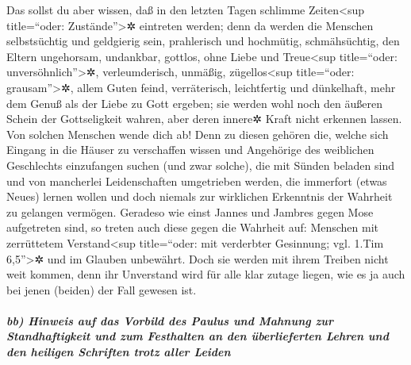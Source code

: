  Das sollst du aber wissen, daß in den letzten Tagen
schlimme Zeiten\textless sup title=``oder: Zustände''\textgreater✲
eintreten werden;  denn da werden die Menschen
selbstsüchtig und geldgierig sein, prahlerisch und hochmütig,
schmähsüchtig, den Eltern ungehorsam, undankbar, gottlos, 
ohne Liebe und Treue\textless sup title=``oder:
unversöhnlich''\textgreater✲, verleumderisch, unmäßig,
zügellos\textless sup title=``oder: grausam''\textgreater✲, allem Guten
feind,  verräterisch, leichtfertig und dünkelhaft, mehr
dem Genuß als der Liebe zu Gott ergeben;  sie werden wohl
noch den äußeren Schein der Gottseligkeit wahren, aber deren innere✲
Kraft nicht erkennen lassen. Von solchen Menschen wende dich ab!
 Denn zu diesen gehören die, welche sich Eingang in die
Häuser zu verschaffen wissen und Angehörige des weiblichen Geschlechts
einzufangen suchen (und zwar solche), die mit Sünden beladen sind und
von mancherlei Leidenschaften umgetrieben werden,  die
immerfort (etwas Neues) lernen wollen und doch niemals zur wirklichen
Erkenntnis der Wahrheit zu gelangen vermögen.  Geradeso
wie einst Jannes und Jambres gegen Mose aufgetreten sind, so treten auch
diese gegen die Wahrheit auf: Menschen mit zerrüttetem
Verstand\textless sup title=``oder: mit verderbter Gesinnung; vgl. 1.Tim
6,5''\textgreater✲ und im Glauben unbewährt.  Doch sie
werden mit ihrem Treiben nicht weit kommen, denn ihr Unverstand wird für
alle klar zutage liegen, wie es ja auch bei jenen (beiden) der Fall
gewesen ist.

\hypertarget{bb-hinweis-auf-das-vorbild-des-paulus-und-mahnung-zur-standhaftigkeit-und-zum-festhalten-an-den-uxfcberlieferten-lehren-und-den-heiligen-schriften-trotz-aller-leiden}{%
\subparagraph{bb) Hinweis auf das Vorbild des Paulus und Mahnung zur
Standhaftigkeit und zum Festhalten an den überlieferten Lehren und den
heiligen Schriften trotz aller
Leiden}\label{bb-hinweis-auf-das-vorbild-des-paulus-und-mahnung-zur-standhaftigkeit-und-zum-festhalten-an-den-uxfcberlieferten-lehren-und-den-heiligen-schriften-trotz-aller-leiden}}

